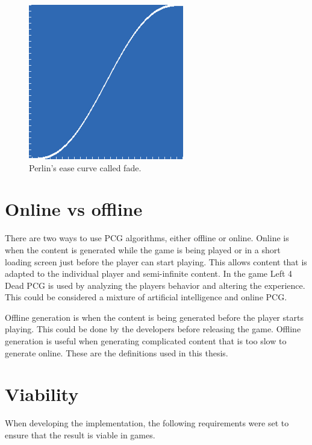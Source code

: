 \begin{figure}[h]
	\centering
	\includegraphics[width=0.35\linewidth]{"Images/fade"}
	\caption{Perlin's ease curve called fade.}
	\label{fig:fade}
\end{figure}
	
\section{Online vs offline}
There are two ways to use PCG algorithms, either offline or online. Online is when the content is generated while the game is being played or in a short loading screen just before the player can start playing. This allows content that is adapted to the individual player and semi-infinite content\cite{PCGGames}. In the game Left 4 Dead\cite{Left4Dead} PCG is used by analyzing the players behavior and altering the experience. This could be considered a mixture of artificial intelligence and online PCG.
\par
Offline generation is when the content is being generated before the player starts playing. This could be done by the developers before releasing the game. Offline generation is useful when generating complicated content that is too slow to generate online. These are the definitions used in this thesis.
	
\section{Viability}
When developing the implementation, the following requirements were set to ensure that the result is viable in games.
	
